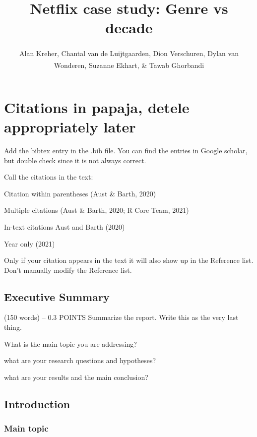 \documentclass[
  english,
  man,floatsintext]{apa6}
\title{Netflix case study: Genre vs decade}
\author{Alan Kreher\textsuperscript{}, Chantal van de Luijtgaarden\textsuperscript{}, Dion Verschuren\textsuperscript{}, Dylan van Wonderen\textsuperscript{}, Suzanne Ekhart\textsuperscript{}, \& Tawab Ghorbandi\textsuperscript{}}
\date{}
\affiliation{\vspace{0.5cm}\textsuperscript{1} Jheronimus Academy of Data Science\\\textsuperscript{2} Eindhoven University of Technology\\\textsuperscript{3} Tilburg University}
\begin{document}
\maketitle

{
\setcounter{tocdepth}{3}
\tableofcontents
}
\hypertarget{citations-in-papaja-detele-appropriately-later}{%
\section{Citations in papaja, detele appropriately later}\label{citations-in-papaja-detele-appropriately-later}}

Add the bibtex entry in the .bib file. You can find the entries in Google scholar,
but double check since it is not always correct.

Call the citations in the text:

Citation within parentheses (Aust \& Barth, 2020)

Multiple citations (Aust \& Barth, 2020; R Core Team, 2021)

In-text citations Aust and Barth (2020)

Year only (2021)

Only if your citation appears in the text it will also show up in the Reference
list. Don't manually modify the Reference list.

\hypertarget{executive-summary}{%
\subsection{Executive Summary}\label{executive-summary}}

(150 words) -- 0.3 POINTS
Summarize the report. Write this as the very last thing.

What is the main topic you are addressing?

what are your research questions and hypotheses?

what are your results and the main conclusion?

\hypertarget{introduction}{%
\subsection{Introduction}\label{introduction}}

\hypertarget{main-topic}{%
\subsubsection{Main topic}\label{main-topic}}
\end{document}
